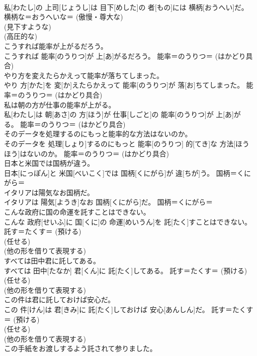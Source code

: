 \documentclass[8pt]{extreport}
\begin{document}
\begin{CJK}{UTF8}{min}
{\\	私[わたし]の 上司[じょうし]は 目下[めした]の 者[もの]には 横柄[おうへい]だ。	横柄な＝おうへいな＝ (傲慢・尊大な) 
\\	(見下すような) 
\\	(高圧的な) 
\\	こうすれば能率が上がるだろう。	
\\	こうすれば 能率[のうりつ]が 上[あ]がるだろう。	能率＝のうりつ＝ (はかどり具合) 
\\	やり方を変えたらかえって能率が落ちてしまった。	
\\	やり 方[かた]を 変[か]えたらかえって 能率[のうりつ]が 落[お]ちてしまった。	能率＝のうりつ＝ (はかどり具合) 
\\	私は朝の方が仕事の能率が上がる。	
\\	私[わたし]は 朝[あさ]の 方[ほう]が 仕事[しごと]の 能率[のうりつ]が 上[あ]がる。	能率＝のうりつ＝ (はかどり具合) 
\\	そのデータを処理するのにもっと能率的な方法はないのか。	
\\	そのデータを 処理[しょり]するのにもっと 能率[のうりつ] 的[てき]な 方法[ほうほう]はないのか。	能率＝のうりつ＝ (はかどり具合) 
\\	日本と米国では国柄が違う。	
\\	日本[にっぽん]と 米国[べいこく]では 国柄[くにがら]が 違[ちが]う。	国柄＝くにがら＝ 
\\	イタリアは陽気なお国柄だ。	
\\	イタリアは 陽気[ようき]なお 国柄[くにがら]だ。	国柄＝くにがら＝ 
\\	こんな政府に国の命運を託すことはできない。	
\\	こんな 政府[せいふ]に 国[くに]の 命運[めいうん]を 託[たく]すことはできない。	託す＝たくす＝ (預ける) 
\\	(任せる) 
\\	(他の形を借りて表現する) 
\\	すべては田中君に託してある。	
\\	すべては 田中[たなか] 君[くん]に 託[たく]してある。	託す＝たくす＝ (預ける) 
\\	(任せる) 
\\	(他の形を借りて表現する) 
\\	この件は君に託しておけば安心だ。	
\\	この 件[けん]は 君[きみ]に 託[たく]しておけば 安心[あんしん]だ。	託す＝たくす＝ (預ける) 
\\	(任せる) 
\\	(他の形を借りて表現する) 
\\	この手紙をお渡しするよう託されて参りました。	
}
\end{CJK}
\end{document}
